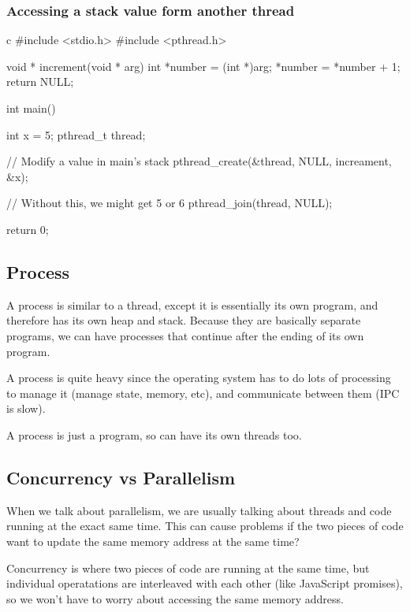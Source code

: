 \subsubsection{Accessing a stack value form another thread}\label{ssub:accessing_a_stack_value_form_another_thread}

\begin{code}{c}
#include <stdio.h>
#include <pthread.h>

void * increment(void * arg) {
    int *number = (int *)arg;
    *number = *number + 1;
    return NULL;
}

int main() {
    int x = 5;
    pthread_t thread;

    // Modify a value in main's stack
    pthread_create(&thread, NULL, increament, &x);

    // Without this, we might get 5 or 6
    pthread_join(thread, NULL);
    
    return 0;
}
\end{code}

\subsection{Process}\label{sub:process_parallelism}

A process is similar to a thread, except it is essentially its own program, and therefore has its own heap and stack.
Because they are basically separate programs, we can have processes that continue after the ending of its own program.

A process is quite heavy since the operating system has to do lots of processing to manage it (manage state, memory, etc), and communicate between them (IPC is slow).
\begin{note}
    A process is just a program, so can have its own threads too.
\end{note}

\subsection{Concurrency vs Parallelism}\label{sub:concurrency_vs_parallelism}

When we talk about parallelism, we are usually talking about threads and code running at the exact same time.
This can cause problems if the two pieces of code want to update the same memory address at the same time?

Concurrency is where two pieces of code are running at the same time, but individual operatations are interleaved with each other (like JavaScript promises), so we won't have to worry about accessing the same memory address.
